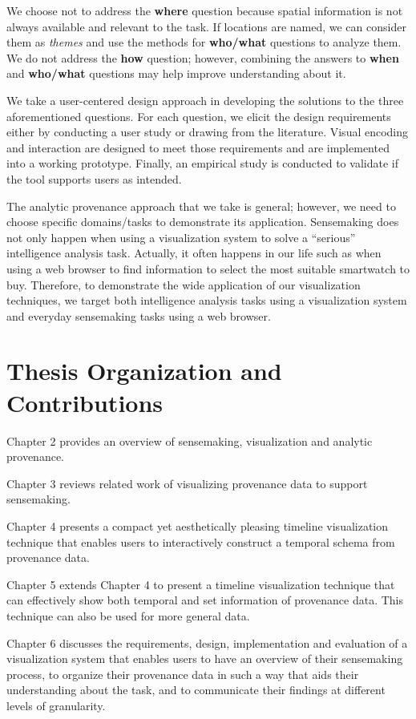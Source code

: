 We choose not to address the \textbf{where} question because spatial information is not always available and relevant to the task. If locations are named, we can consider them as \emph{themes} and use the methods for \textbf{who/what} questions to analyze them. We do not address the \textbf{how} question; however, combining the answers to \textbf{when} and \textbf{who/what} questions may help improve understanding about it.

We take a user-centered design approach in developing the solutions to the three aforementioned questions. For each question, we elicit the design requirements either by conducting a user study or drawing from the literature. Visual encoding and interaction are designed to meet those requirements and are implemented into a working prototype. Finally, an empirical study is conducted to validate if the tool supports users as intended.  

The analytic provenance approach that we take is general; however, we need to choose specific domains/tasks to demonstrate its application. Sensemaking does not only happen when using a visualization system to solve a ``serious'' intelligence analysis task. Actually, it often happens in our life such as when using a web browser to find information to select the most suitable smartwatch to buy. Therefore, to demonstrate the wide application of our visualization techniques, we target both intelligence analysis tasks using a visualization system and everyday sensemaking tasks using a web browser.

\section{Thesis Organization and Contributions}
Chapter 2 provides an overview of sensemaking, visualization and analytic provenance.

Chapter 3 reviews related work of visualizing provenance data to support sensemaking.

Chapter 4 presents a compact yet aesthetically pleasing timeline visualization technique that enables users to interactively construct a temporal schema from provenance data.

Chapter 5 extends Chapter 4 to present a timeline visualization technique that can effectively show both temporal and set information of provenance data. This technique can also be used for more general data.

Chapter 6 discusses the requirements, design, implementation and evaluation of a visualization system that enables users to have an overview of their sensemaking process, to organize their provenance data in such a way that aids their understanding about the task, and to communicate their findings at different levels of granularity.


